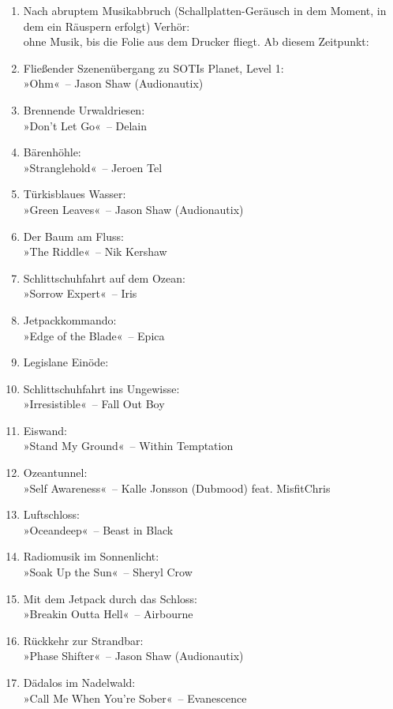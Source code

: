 \begin{enumerate}
    \item Nach abruptem Musikabbruch (Schallplatten-Geräusch in dem Moment, in dem ein Räuspern erfolgt) Verhör:\\ ohne Musik, bis die Folie aus dem Drucker fliegt. Ab diesem Zeitpunkt:
    \item Fließender Szenenübergang zu SOTIs Planet, Level 1:\\ »Ohm«~– Jason Shaw (Audionautix)
    \item Brennende Urwaldriesen:\\ »Don’t Let Go«~– Delain
    \item Bärenhöhle:\\ »Stranglehold«~– Jeroen Tel
    \item Türkisblaues Wasser:\\ »Green Leaves«~– Jason Shaw (Audionautix)
    \item Der Baum am Fluss:\\ »The Riddle«~– Nik Kershaw
    \item Schlittschuhfahrt auf dem Ozean:\\ »Sorrow Expert«~– Iris %
    \item Jetpackkommando:\\ »Edge of the Blade«~– Epica
    \item Legislane Einöde:\\
    \item Schlittschuhfahrt ins Ungewisse:\\ »Irresistible«~– Fall Out Boy %
    \item Eiswand:\\ »Stand My Ground«~– Within Temptation
    \item Ozeantunnel:\\ »Self Awareness«~– Kalle Jonsson (Dubmood) feat. MisfitChris
    \item Luftschloss:\\ »Oceandeep«~– Beast in Black
    \item Radiomusik im Sonnenlicht:\\ »Soak Up the Sun«~– Sheryl Crow
    \item Mit dem Jetpack durch das Schloss:\\ »Breakin Outta Hell«~– Airbourne
    \item Rückkehr zur Strandbar:\\ »Phase Shifter«~– Jason Shaw (Audionautix)
    \item Dädalos im Nadelwald:\\ »Call Me When You're Sober«~– Evanescence

\end{enumerate}
